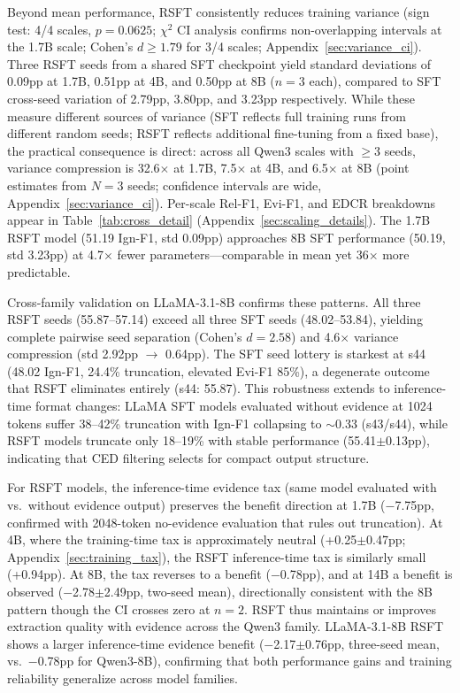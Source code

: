 Beyond mean performance, RSFT consistently reduces training variance (sign test: 4/4 scales, $p{=}0.0625$; $\chi^2$ CI analysis confirms non-overlapping intervals at the 1.7B scale; Cohen's $d \geq 1.79$ for 3/4 scales; Appendix~\ref{sec:variance_ci}). Three RSFT seeds from a shared SFT checkpoint yield standard deviations of 0.09pp at 1.7B, 0.51pp at 4B, and 0.50pp at 8B ($n{=}3$ each), compared to SFT cross-seed variation of 2.79pp, 3.80pp, and 3.23pp respectively. While these measure different sources of variance (SFT reflects full training runs from different random seeds; RSFT reflects additional fine-tuning from a fixed base), the practical consequence is direct: across all Qwen3 scales with $\geq$3 seeds, variance compression is 32.6$\times$ at 1.7B, 7.5$\times$ at 4B, and 6.5$\times$ at 8B (point estimates from $N{=}3$ seeds; confidence intervals are wide, Appendix~\ref{sec:variance_ci}). Per-scale Rel-F1, Evi-F1, and EDCR breakdowns appear in Table~\ref{tab:cross_detail} (Appendix~\ref{sec:scaling_details}). The 1.7B RSFT model (51.19 Ign-F1, std 0.09pp) approaches 8B SFT performance (50.19, std 3.23pp) at 4.7$\times$ fewer parameters---comparable in mean yet 36$\times$ more predictable.

Cross-family validation on LLaMA-3.1-8B confirms these patterns. All three RSFT seeds (55.87--57.14) exceed all three SFT seeds (48.02--53.84), yielding complete pairwise seed separation (Cohen's $d{=}2.58$) and 4.6$\times$ variance compression (std 2.92pp $\to$ 0.64pp). The SFT seed lottery is starkest at s44 (48.02 Ign-F1, 24.4\% truncation, elevated Evi-F1 85\%), a degenerate outcome that RSFT eliminates entirely (s44: 55.87). This robustness extends to inference-time format changes: LLaMA SFT models evaluated without evidence at 1024 tokens suffer 38--42\% truncation with Ign-F1 collapsing to ${\sim}$0.33 (s43/s44), while RSFT models truncate only 18--19\% with stable performance (55.41$\pm$0.13pp), indicating that CED filtering selects for compact output structure.

For RSFT models, the inference-time evidence tax (same model evaluated with vs.\ without evidence output) preserves the benefit direction at 1.7B ($-$7.75pp, confirmed with 2048-token no-evidence evaluation that rules out truncation). At 4B, where the training-time tax is approximately neutral (+0.25$\pm$0.47pp; Appendix~\ref{sec:training_tax}), the RSFT inference-time tax is similarly small (+0.94pp). At 8B, the tax reverses to a benefit ($-$0.78pp), and at 14B a benefit is observed ($-$2.78$\pm$2.49pp, two-seed mean), directionally consistent with the 8B pattern though the CI crosses zero at $n{=}2$. RSFT thus maintains or improves extraction quality with evidence across the Qwen3 family. LLaMA-3.1-8B RSFT shows a larger inference-time evidence benefit ($-$2.17$\pm$0.76pp, three-seed mean, vs.\ $-$0.78pp for Qwen3-8B), confirming that both performance gains and training reliability generalize across model families.

